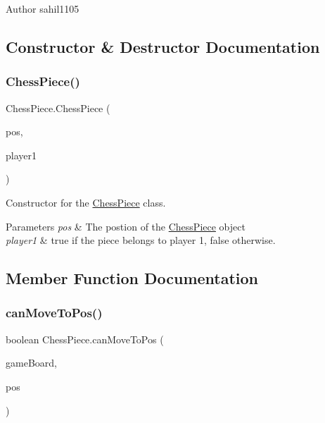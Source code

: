 \begin{DoxyAuthor}{Author}
sahil1105 
\end{DoxyAuthor}


\subsection{Constructor \& Destructor Documentation}
\mbox{\label{class_chess_piece_abe5af350343324a1cc0f81db96707249}} 
\subsubsection{\texorpdfstring{Chess\+Piece()}{ChessPiece()}}
{\footnotesize\ttfamily Chess\+Piece.\+Chess\+Piece (\begin{DoxyParamCaption}\item[{@Not\+Null int \mbox{[}$\,$\mbox{]}}]{pos,  }\item[{boolean}]{player1 }\end{DoxyParamCaption})}

Constructor for the \mbox{\hyperlink{class_chess_piece}{Chess\+Piece}} class. 
\begin{DoxyParams}{Parameters}
{\em pos} & The postion of the \mbox{\hyperlink{class_chess_piece}{Chess\+Piece}} object \\
\hline
{\em player1} & \textquotesingle{}true\textquotesingle{} if the piece belongs to player 1, false otherwise. \\
\hline
\end{DoxyParams}


\subsection{Member Function Documentation}
\mbox{\label{class_chess_piece_a927daa9d5c14a1215d5869e598ebdafe}} 
\subsubsection{\texorpdfstring{can\+Move\+To\+Pos()}{canMoveToPos()}}
{\footnotesize\ttfamily boolean Chess\+Piece.\+can\+Move\+To\+Pos (\begin{DoxyParamCaption}\item[{@Not\+Null \mbox{\hyperlink{class_board}{Board}}}]{game\+Board,  }\item[{int \mbox{[}$\,$\mbox{]}}]{pos }\end{DoxyParamCaption})}

